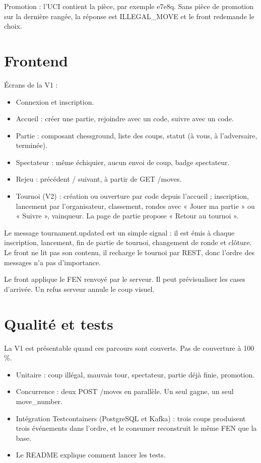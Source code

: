 \documentclass[11pt,a4paper]{article}
\newcommand{\field}[1]{{\ttfamily #1}}
\begin{document}
Promotion : l'UCI contient la pièce, par exemple \field{e7e8q}. Sans pièce de promotion sur la dernière rangée, la réponse est \field{ILLEGAL\_MOVE} et le front redemande le choix.

\section{Frontend}

Écrans de la V1 :

\begin{itemize}
  \item Connexion et inscription.
  \item Accueil : créer une partie, rejoindre avec un code, suivre avec un code.
  \item Partie : composant chessground, liste des coups, statut (à vous, à l'adversaire, terminée).
  \item Spectateur : même échiquier, aucun envoi de coup, badge spectateur.
  \item Rejeu : précédent / suivant, à partir de \field{GET /moves}.
  \item Tournoi (V2) : création ou ouverture par code depuis l'accueil ; inscription, lancement par l'organisateur, classement, rondes avec « Jouer ma partie » ou « Suivre », vainqueur. La page de partie propose « Retour au tournoi ».
\end{itemize}

Le message \field{tournament.updated} est un simple signal : il est émis à chaque inscription, lancement, fin de partie de tournoi, changement de ronde et clôture. Le front ne lit pas son contenu, il recharge le tournoi par REST, donc l'ordre des messages n'a pas d'importance.

Le front applique le FEN renvoyé par le serveur. Il peut prévisualiser les cases d'arrivée. Un refus serveur annule le coup visuel.

\section{Qualité et tests}

La V1 est présentable quand ces parcours sont couverts. Pas de couverture à 100 \%.

\begin{itemize}
  \item Unitaire : coup illégal, mauvais tour, spectateur, partie déjà finie, promotion.
  \item Concurrence : deux \field{POST /moves} en parallèle. Un seul gagne, un seul \field{move\_number}.
  \item Intégration Testcontainers (PostgreSQL et Kafka) : trois coups produisent trois événements dans l'ordre, et le consumer reconstruit le même FEN que la base.
  \item Le README explique comment lancer les tests.
\end{itemize}
\end{document}
